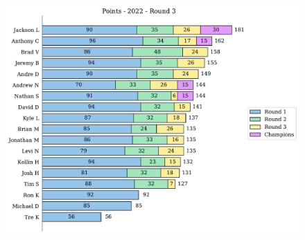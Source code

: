 \documentclass[10pt]{article}
\begin{document}
\begin{minipage}[t]{13cm}
    \begin{figure}[H]
        \vspace{-3.5cm}
        \includegraphics[width=12cm]{../../figures/2022/Points-2022-Round3.pdf}
    \end{figure}
\end{minipage}
\end{document}
